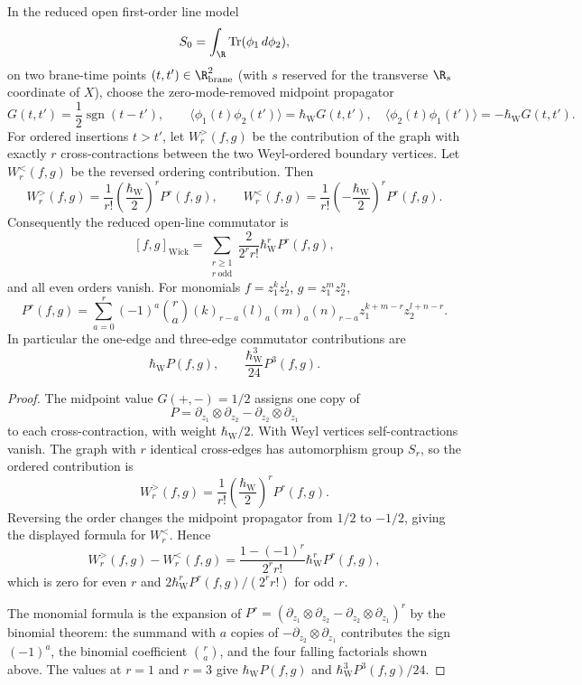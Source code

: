 \documentclass[11pt]{memoir}
\begin{document}
\begin{thm}\label{thm:open-line-midpoint-graph-weights}
  In the reduced open first-order line model
  $$S_0=\int_\R\mathrm{Tr}(\phi_1\,d\phi_2),$$
  on two brane-time points $(t,t')\in\R^2_{\mathrm{brane}}$ (with $s$
  reserved for the transverse $\R_s$ coordinate of $X$), choose the
  zero-mode-removed midpoint propagator
  $$G(t,t')=\frac12\operatorname{sgn}(t-t'),\qquad
	    \langle\phi_1(t)\phi_2(t')\rangle=\hbar_{\mathrm{W}} G(t,t'),\quad
	    \langle\phi_2(t)\phi_1(t')\rangle=-\hbar_{\mathrm{W}} G(t,t').$$
  For ordered insertions \(t>t'\), let \(W_r^>(f,g)\) be the contribution
  of the graph with exactly \(r\) cross-contractions between the two
  Weyl-ordered boundary vertices.  Let \(W_r^<(f,g)\) be the reversed
  ordering contribution.  Then
  \[
	    W_r^>(f,g)=\frac1{r!}\left(\frac{\hbar_{\mathrm{W}}}{2}\right)^rP^r(f,g),
	    \qquad
	    W_r^<(f,g)=\frac1{r!}\left(-\frac{\hbar_{\mathrm{W}}}{2}\right)^rP^r(f,g).
  \]
  Consequently the reduced open-line commutator is
  \[
    [f,g]_{\mathrm{Wick}}
      =
      \sum_{\substack{r\geq1\\ r\ \mathrm{odd}}}
	      \frac{2}{2^r r!}\hbar_{\mathrm{W}}^rP^r(f,g),
  \]
  and all even orders vanish.  For monomials
  \(f=z_1^kz_2^l\), \(g=z_1^mz_2^n\),
  \[
    P^r(f,g)=
    \sum_{a=0}^r(-1)^a\binom ra
    (k)_{r-a}(l)_a(m)_a(n)_{r-a}
    z_1^{k+m-r}z_2^{l+n-r}.
  \]
  In particular the one-edge and three-edge commutator contributions are
  \[
	    \hbar_{\mathrm{W}} P(f,g),\qquad \frac{\hbar_{\mathrm{W}}^3}{24}P^3(f,g).
  \]
\end{thm}

\begin{proof}
  The midpoint value $G(+,-)=1/2$ assigns one copy of
  $$P=\partial_{z_1}\otimes\partial_{z_2}
    -\partial_{z_2}\otimes\partial_{z_1}$$
	  to each cross-contraction, with weight \(\hbar_{\mathrm{W}}/2\).  With Weyl vertices
  self-contractions vanish.  The graph with \(r\) identical
  cross-edges has automorphism group \(S_r\), so the ordered contribution
  is
  \[
	    W_r^>(f,g)=\frac1{r!}\left(\frac{\hbar_{\mathrm{W}}}{2}\right)^rP^r(f,g).
  \]
  Reversing the order changes the midpoint propagator from \(1/2\) to
  \(-1/2\), giving the displayed formula for \(W_r^<\).  Hence
  \[
    W_r^>(f,g)-W_r^<(f,g)
	      =\frac{1-(-1)^r}{2^r r!}\hbar_{\mathrm{W}}^rP^r(f,g),
  \]
	  which is zero for even \(r\) and \(2\hbar_{\mathrm{W}}^rP^r(f,g)/(2^r r!)\) for odd
  \(r\).

  The monomial formula is the expansion of
  \(P^r=(\partial_{z_1}\otimes\partial_{z_2}
  -\partial_{z_2}\otimes\partial_{z_1})^r\) by the binomial theorem:
  the summand with \(a\) copies of
  \(-\partial_{z_2}\otimes\partial_{z_1}\) contributes the sign
  \((-1)^a\), the binomial coefficient \(\binom ra\), and the four
  falling factorials shown above.  The values at \(r=1\) and \(r=3\)
	  give \(\hbar_{\mathrm{W}} P(f,g)\) and \(\hbar_{\mathrm{W}}^3P^3(f,g)/24\).
\end{proof}
\end{document}
